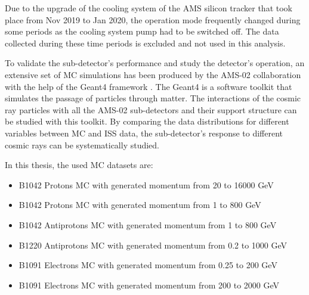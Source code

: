 Due to the upgrade of the cooling system of the AMS silicon tracker that took place from Nov 2019 to Jan 2020, the operation mode frequently changed during some periods as the cooling system pump had to be switched off. The data collected during these time periods is excluded and not used in this analysis. \par

To validate the sub-detector's performance and study the detector's operation, an extensive set of MC simulations has been produced by the AMS-02 collaboration with the help of the Geant4 framework \cite{GEANT4Paper1, GEANT4Paper2}. The Geant4 is a software toolkit that simulates the passage of particles through matter. The interactions of the cosmic ray particles with all the AMS-02 sub-detectors and their support structure can be studied with this toolkit. By comparing the data distributions for different variables between MC and ISS data, the sub-detector's response to different cosmic rays can be systematically studied. \par   


\begin{comment}  	

1. For CC training and CCProton Template:
B1042_pr.pl1.flux.l1a9.2016000_7.6_all
B1042_pr.pl1.flux.l1o9.2016000_7.6_all

2. For acceptance:
Proton:
B1042_pr.pl1.1800_7.6_all
Antiproton:
B1042_antipr.pl1.1800_7.6_all
B1220_antipr.pl1ph.021000.qgsp_bic_ams.plus10_7.8_all
B1220_antipr.pl1ph.021000.qgsp_bic_ams_7.8_all		
B1220_antipr.pl1ph.021000.qgsp_bic_ams.minus10_7.8_all	

3. Electron:
B1091_el.pl1.0_25_2000_7.6_all_merged	
B1091_el.pl1.0_25200_7.6_all		
B1091_el.pl1.2002000_7.6_all	

4. Data:
B1130_pass7	

others:	
B1220_pr.pl1ph.021000_7.8_all	
B1220_pr.pl1phpsa.0550.4_00_7.8_all	
B1220_pr.pl1phpsa.l19.5016000.4_00_7.8_merged 
B1220_pr.pl1phpsa.l1o9.flux.2016000.4_00_7.8_all
B1200_el.pl1.120_7.8_all	

\end{comment}		
	
In this thesis, the used MC datasets are:
\begin{itemize}
\item B1042 Protons MC with generated momentum from 20 to 16000 GeV
\item B1042 Protons MC with generated momentum from 1 to 800 GeV
\item B1042 Antiprotons MC with generated momentum from 1 to 800 GeV
\item B1220 Antiprotons MC with generated momentum from 0.2 to 1000 GeV 
\item B1091 Electrons MC with generated momentum from 0.25 to 200 GeV
\item B1091 Electrons MC with generated momentum from 200 to 2000 GeV
\end{itemize}

